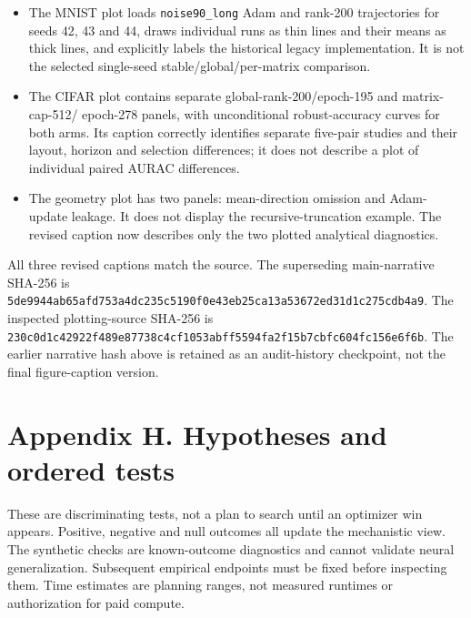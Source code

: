 \documentclass[
  british,
  10pt,
  a4paper,
]{article}
\providecommand{\tightlist}{%
  \setlength{\itemsep}{0pt}\setlength{\parskip}{0pt}}
\begin{document}
\begin{itemize}
\tightlist
\item
  The MNIST plot loads \texttt{noise90\_\allowbreak{}long} Adam and
  rank-200 trajectories for seeds 42, 43 and 44, draws individual runs
  as thin lines and their means as thick lines, and explicitly labels
  the historical legacy implementati\allowbreak{}on.\allowbreak{} It is
  not the selected single-\allowbreak{}seed
  stable/\allowbreak{}global/\allowbreak{}per-\allowbreak{}matrix
  comparison.\allowbreak{}
\item
  The CIFAR plot contains separate
  global-\allowbreak{}rank-\allowbreak{}200/\allowbreak{}epoch-\allowbreak{}195
  and matrix-\allowbreak{}cap-\allowbreak{}512/\allowbreak{} epoch-278
  panels, with unconditional robust-\allowbreak{}accuracy curves for
  both arms. Its caption correctly identifies separate five-pair studies
  and their layout, horizon and selection differences; it does not
  describe a plot of individual paired AURAC differences.\allowbreak{}
\item
  The geometry plot has two panels: mean-\allowbreak{}direction omission
  and Adam-\allowbreak{}update leakage. It does not display the
  recursive-\allowbreak{}truncation example. The revised caption now
  describes only the two plotted analytical diagnostics.\allowbreak{}
\end{itemize}

All three revised captions match the source. The superseding
main-\allowbreak{}narrative SHA-256 is
\texttt{5de9944ab65a\allowbreak{}fd753a4dc235\allowbreak{}c5190f0e43eb\allowbreak{}25ca13a53672\allowbreak{}ed31d1c275cd\allowbreak{}b4a9}.
The inspected plotting-\allowbreak{}source SHA-256 is
\texttt{230c0d1c4292\allowbreak{}2f489e87738c\allowbreak{}4cf1053abff5\allowbreak{}594fa2f15b7c\allowbreak{}bfc604fc156e\allowbreak{}6f6b}.
The earlier narrative hash above is retained as an
audit-\allowbreak{}history checkpoint,\allowbreak{} not the final
figure-\allowbreak{}caption version.

\clearpage

\section{Appendix H. Hypotheses and ordered
tests}\label{hypotheses-and-tests}

These are discriminating tests, not a plan to search until an optimizer
win appears. Positive, negative and null outcomes all update the
mechanistic view. The synthetic checks are known-\allowbreak{}outcome
diagnostics and cannot validate neural
generalizati\allowbreak{}on.\allowbreak{} Subsequent empirical endpoints
must be fixed before inspecting them. Time estimates are planning
ranges, not measured runtimes or authorization for paid compute.
\end{document}
